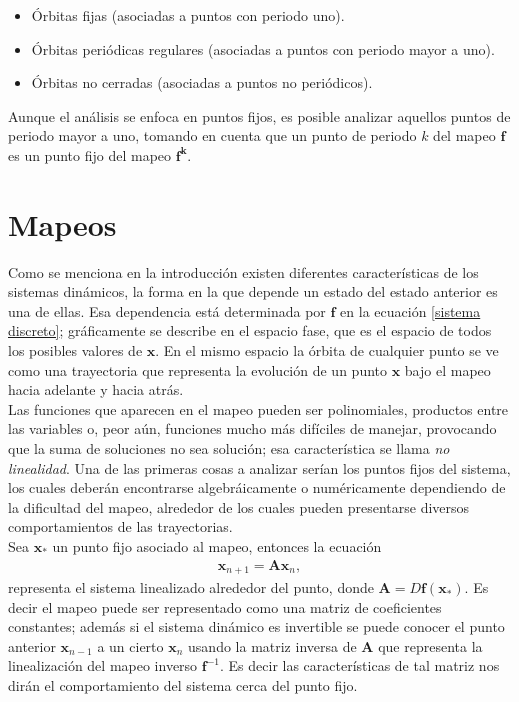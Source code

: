\begin{itemize}
\item  Órbitas fijas (asociadas a puntos con periodo uno).
\item Órbitas periódicas regulares (asociadas a puntos con periodo mayor a uno).
\item Órbitas no cerradas (asociadas a puntos no periódicos).
\end{itemize}
Aunque el análisis se enfoca en puntos fijos, es posible analizar aquellos puntos de periodo mayor a uno, tomando en cuenta que un punto de periodo $k$ del mapeo $\mathbf{f}$ es un punto fijo del mapeo $\mathbf{f^{k}}.$
\section{Mapeos}
Como se menciona en la introducción existen diferentes características de los sis\-te\-mas dinámicos, la forma en la que depende un estado del estado anterior es una de ellas. Esa dependencia está determinada por $\mathbf{f}$ en la ecuación \eqref{sistema discreto}; gráficamente se describe en el espacio fase, que es el espacio de todos los posibles valores de $\pmb x$. En el mismo espacio la órbita de cualquier punto se ve como una trayectoria que representa la evolución de un punto $\pmb x$ bajo el mapeo hacia adelante y hacia atrás. \\

Las funciones que aparecen en el mapeo pueden ser polinomiales, productos entre las variables o, peor aún, funciones mucho más difíciles de manejar, provocando que la suma de soluciones no sea solución; esa característica se llama \textit{no linealidad}. Una de las primeras cosas a analizar serían los puntos fijos del sistema, los cuales deberán encontrarse algebráicamente o numéricamente dependiendo de la dificultad del mapeo, alrededor de los cuales pueden presentarse diversos comportamientos de las trayectorias.\\

Sea $\mathbf{x}_{*}$ un punto fijo asociado al mapeo, entonces la ecuación
\begin{eqnarray}
\mathbf{x}_{n+1} =\mathbf{A}\mathbf{x}_{n},
\end{eqnarray}
representa el sistema linealizado alrededor del punto, donde $\mathbf{A}=D\mathbf{f}(\mathbf{x}_{*})$. Es decir el mapeo puede ser representado como una matriz de coeficientes constantes; además si el sistema dinámico es invertible se puede conocer el punto anterior $\mathbf{x}_{n-1}$ a un cierto $\mathbf{x}_{n}$ usando la matriz inversa de $\mathbf{A}$ que representa la linealización del mapeo inverso $\mathbf{f}^{-1}$. Es decir las características de tal matriz nos dirán el comportamiento del sistema cerca del punto fijo. \\

